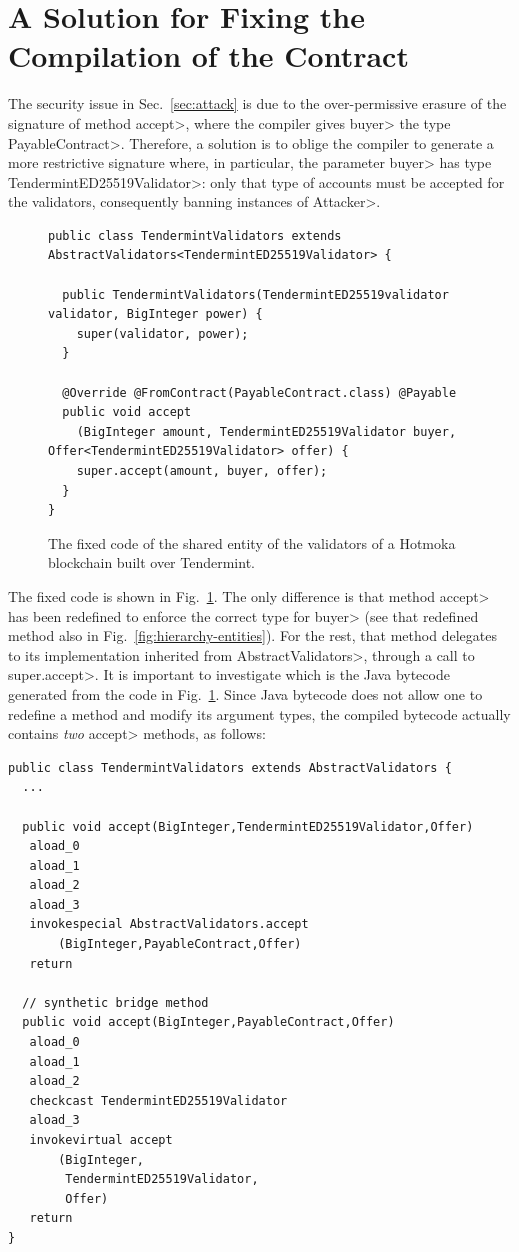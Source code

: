 \section{A Solution for Fixing the Compilation of the Contract}\label{sec:fix}

The security issue in Sec.~\ref{sec:attack} is due to the
over-permissive erasure of the signature of method \<accept>,
where the compiler gives \<buyer> the type \<PayableContract>.
Therefore, a solution is to oblige the compiler to generate a more
restrictive signature where, in particular, the parameter \<buyer>
has type \<TendermintED25519Validator>: only that type of accounts
must be accepted for the validators, consequently banning instances of \<Attacker>.

\begin{figure}[ht]
  \begin{center}
    \begin{lstlisting}[language=Takamaka]
public class TendermintValidators extends AbstractValidators<TendermintED25519Validator> {

  public TendermintValidators(TendermintED25519validator validator, BigInteger power) {
    super(validator, power);
  }

  @Override @FromContract(PayableContract.class) @Payable
  public void accept
    (BigInteger amount, TendermintED25519Validator buyer, Offer<TendermintED25519Validator> offer) {
    super.accept(amount, buyer, offer);
  }
}
    \end{lstlisting}
  \end{center}
  \caption{The fixed code of the shared entity of the validators of a Hotmoka blockchain built over Tendermint.}\label{fig:solution}
\end{figure}

The fixed code is shown in Fig.~\ref{fig:solution}. The only difference is that method
\<accept> has been redefined to enforce the correct type for \<buyer>
(see that redefined method also in Fig.~\ref{fig:hierarchy-entities}). For the rest, that method
delegates to its implementation inherited from \<AbstractValidators>, through a call
to \<super.accept>.
It is important to investigate which is the Java bytecode generated from
the code in Fig.~\ref{fig:solution}. Since Java bytecode does not allow one to redefine a method
and modify its argument types, the compiled bytecode actually contains \emph{two}
\<accept> methods, as follows:

\begin{lstlisting}[language=JavaBytecode]
public class TendermintValidators extends AbstractValidators {
  ...
  
  public void accept(BigInteger,TendermintED25519Validator,Offer)
   aload_0
   aload_1
   aload_2
   aload_3
   invokespecial AbstractValidators.accept
       (BigInteger,PayableContract,Offer)
   return

  // synthetic bridge method
  public void accept(BigInteger,PayableContract,Offer)
   aload_0
   aload_1
   aload_2
   checkcast TendermintED25519Validator
   aload_3
   invokevirtual accept
       (BigInteger,
        TendermintED25519Validator,
        Offer)
   return
}
\end{lstlisting}

